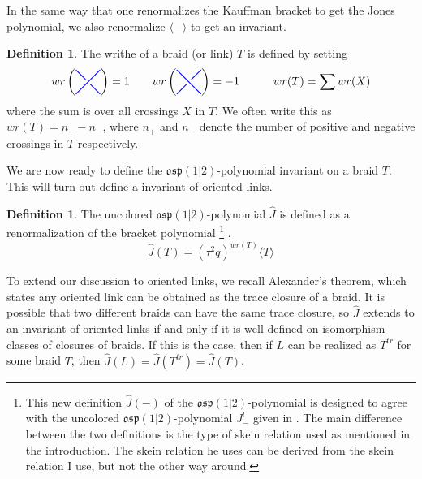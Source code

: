 \documentclass{amsart}
\newcommand{\hackcenter}[1]{
 \xy (0,0)*{#1}; \endxy}
\theoremstyle{plain}
\theoremstyle{definition}
\newtheorem{definition}[theorem]{Definition}
\theoremstyle{definition}
\numberwithin{equation}{section}
\numberwithin{theorem}{section}
\def\mf{\mathfrak}
\numberwithin{equation}{section}
\let\hat=\widehat
\begin{document}

In the same way that one renormalizes the Kauffman bracket to get the Jones polynomial, we also renormalize $\langle - \rangle$ to get an invariant.

\begin{definition}\label{writhe}
  The writhe of a braid (or link) $T$ is defined by setting
\begin{align*}
wr\left(
\hackcenter{ \begin{tikzpicture} [scale=.75]
\draw[thick,   blue] (0,0) to (1,1);
\draw[thick,   blue] (1,0) to (.6,.4);
\draw[thick,   blue] (0,1) to (.4,.6);
\end{tikzpicture}}
\right)=1 & \qquad
wr\left(
\hackcenter{ \begin{tikzpicture} [xscale=-1,scale=.75]
\draw[thick,   blue] (0,0) to (1,1);
\draw[thick,   blue] (1,0) to (.6,.4);
\draw[thick,   blue] (0,1) to (.4,.6);
\end{tikzpicture}}
\right)=-1
& \qquad
wr(T)=\sum wr(X)
\end{align*}
where the sum is over all crossings $X$ in $T$.
We often write this as $wr(T)=n_+-n_-$, where $n_+$ and $n_-$ denote the number of positive and negative crossings in $T$ respectively.
\end{definition}


We are now ready to define the $\mf{osp}(1|2)$-polynomial invariant on a braid $T$. This will turn out define a invariant of oriented links.
\begin{definition}
  The uncolored $\mf{osp}(1|2)$-polynomial $\hat{J}$ is defined as a renormalization of the bracket polynomial
  \footnote{This new definition $\hat{J}(-)$ of the $\mf{osp}(1|2)$-polynomial is designed to agree with the uncolored $\mf{osp}(1|2)$-polynomial $J_{-}^l$ given in \cite[Example 3.10]{C}. The main difference between the two definitions is the type of skein relation used as mentioned in the introduction. The skein relation he uses can be derived from the skein relation I use, but not the other way around.}
  .
  \[
  \hat{J}(T)=(\tau^2 q)^{wr(T)}\langle T \rangle
  \]
\end{definition}

To extend our discussion to oriented links, we recall Alexander's theorem, which states any oriented link can be obtained as the trace closure of a braid.
It is possible that two different braids can have the same trace closure, so $\hat{J}$ extends to an invariant of oriented links if and only if it is well defined on isomorphism classes of closures of braids.
If this is the case, then if $L$ can be realized as $T^{tr}$ for some braid $T$, then $\hat{J}(L)=\hat{J}(T^{tr})=\hat{J}(T)$.
\end{document}
